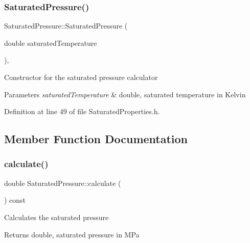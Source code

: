 \mbox{\label{class_saturated_pressure_a67020b0bb7588c643e12e256fa25e0bc}} 
\subsubsection{\texorpdfstring{Saturated\+Pressure()}{SaturatedPressure()}\hspace{0.1cm}{\footnotesize\ttfamily [3/3]}}
{\footnotesize\ttfamily Saturated\+Pressure\+::\+Saturated\+Pressure (\begin{DoxyParamCaption}\item[{double}]{saturated\+Temperature }\end{DoxyParamCaption})\hspace{0.3cm}{\ttfamily [inline]}, {\ttfamily [explicit]}}

Constructor for the saturated pressure calculator 
\begin{DoxyParams}{Parameters}
{\em saturated\+Temperature} & double, saturated temperature in Kelvin \\
\hline
\end{DoxyParams}


Definition at line 49 of file Saturated\+Properties.\+h.



\subsection{Member Function Documentation}
\mbox{\label{class_saturated_pressure_a8ef5357b4f8af1aeaa8dde6ae05b9daa}} 
\subsubsection{\texorpdfstring{calculate()}{calculate()}\hspace{0.1cm}{\footnotesize\ttfamily [1/3]}}
{\footnotesize\ttfamily double Saturated\+Pressure\+::calculate (\begin{DoxyParamCaption}{ }\end{DoxyParamCaption}) const}

Calculates the saturated pressure \begin{DoxyReturn}{Returns}
double, saturated pressure in M\+Pa 
\end{DoxyReturn}


